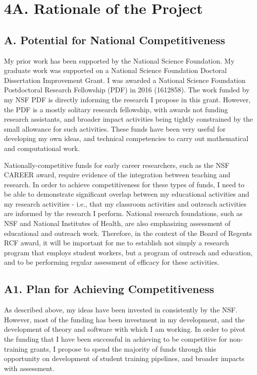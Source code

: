 \documentclass[12pt]{article}
\begin{document}
\section*{4A. Rationale of the Project}
\subsection*{A. Potential for National Competitiveness}

My prior work has been supported by the National Science Foundation. 
My graduate work was supported on a National Science Foundation Doctoral Dissertation Improvement Grant.
I was awarded a National Science Foundation Postdoctoral Research Fellowship (PDF) in 2016 (1612858).
The work funded by my NSF PDF is directly informing the research I propose in this grant.
However, the PDF is a mostly solitary research fellowship, with awards not funding research assistants, and broader impact activities being tightly constrained by the small allowance for such activities. 
These funds have been very useful for developing my own ideas, and technical competencies to carry out mathematical and computational work. \par
Nationally-competitive funds for early career researchers, such as the NSF CAREER award, require evidence of the integration between teaching and research. 
In order to achieve competitiveness for these types of funds, I need to be able to demonstrate significant overlap between my educational activities and my research activities - i.e., that my classroom activities and outreach activities are informed by the research I perform.
National research foundations, such as NSF and National Institutes of Health, are also emphasizing  assessment of educational and outreach work.
Therefore, in the context of the Board of Regents RCF award, it will be important for me to establish not simply a research program that employs student workers, but a program of outreach and education, and to be performing regular assessment of efficacy for these activities. \par
 

\subsection*{A1. Plan for Achieving Competitiveness}

As described above, my ideas have been invested in consistently by the NSF.
However, most of the funding has been investment in my development, and the development of theory and software with which I am working.
In order to pivot the funding that I have been successful in achieving to be competitive for non-training grants, I propose to spend the majority of funds through this opportunity on development of student training pipelines, and broader impacts with assessment. \par
\end{document}
